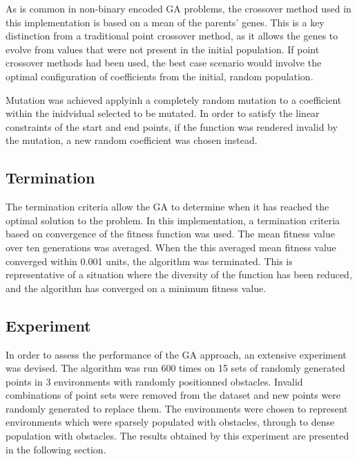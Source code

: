As is common in non-binary encoded GA problems, the crossover method used in this implementation is based on a mean of the parents' genes. This is a key distinction from a traditional point crossover method, as it allows the genes to evolve from values that were not present in the initial population. If point crossover methods had been used, the best case scenario would involve the optimal configuration of coefficients from the initial, random population.

Mutation was achieved applyinh a completely random mutation to a coefficient within the inidvidual selected to be mutated. In order to satisfy the linear constraints of the start and end points, if the function was rendered invalid by the mutation, a new random coefficient was chosen instead.

\subsection{Termination}
The termination criteria allow the GA to determine when it has reached the optimal solution to the problem. In this implementation, a termination criteria based on convergence of the fitness function was used. The mean fitness value over ten generations was averaged. When the this averaged mean fitness value converged within 0.001 units, the algorithm was terminated. This is representative of a situation where the diversity of the function has been reduced, and the algorithm has converged on a minimum fitness value.

\subsection{Experiment} \label{sec:experiment}
In order to assess the performance of the GA approach, an extensive experiment was devised. The algorithm was run 600 times on 15 sets of randomly generated points in 3 environments with randomly positionned obstacles. Invalid combinations of point sets were removed from the dataset and new points were randomly generated to replace them. The environments were chosen to represent environments which were sparsely populated with obstacles, through to dense population with obstacles. The results obtained by this experiment are presented in the following section.